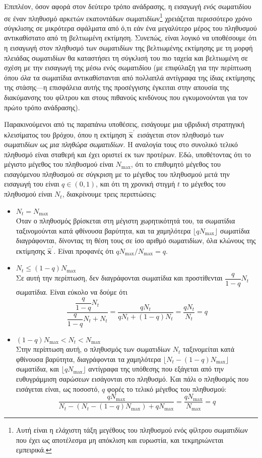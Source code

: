 Επιπλέον, όσον αφορά στον δεύτερο τρόπο ανάδρασης, η εισαγωγή \textit{ενός}
σωματιδίου σε έναν πληθυσμό αρκετών εκατοντάδων σωματιδίων\footnote{Αυτή είναι η
ελάχιστη τάξη μεγέθους του πληθυσμού ενός φίλτρου σωματιδίων που έχει ως
αποτέλεσμα μη απόκλιση και ευρωστία, και τεκμηριώνεται εμπειρικά.} χρειάζεται
περισσότερο χρόνο σύγκλισης σε μικρότερα σφάλματα από ό,τι εάν ένα μεγαλύτερο
μέρος του πληθυσμού αντικαθίστατο από τη βελτιωμένη εκτίμηση.  Συνεπώς, είναι
λογικό να υποθέσουμε ότι η εισαγωγή στον πληθυσμό των σωματιδίων της
βελτιωμένης εκτίμησης με τη μορφή πλειάδας σωματιδίων θα καταστήσει τη σύγκλισή
του πιο ταχεία και βελτιωμένη σε σχέση με την εισαγωγή της μέσω ενός σωματιδίου
(με επιφύλαξη για την περίπτωση όπου \textit{όλα} τα σωματίδια αντικαθίστανται
από πολλαπλά αντίγραφα της ίδιας εκτίμησης της στάσης---η επισφάλεια αυτής της
προσέγγισης έγκειται στην απουσία της διακύμανσης του φίλτρου και στους
πιθανούς κινδύνους που εγκυμονούνται για τον πρώτο τρόπο ανάδρασης).

Παρακινούμενοι από τις παραπάνω υποθέσεις, εισάγουμε μια υβριδική στρατηγική
κλεισίματος του βρόχου, όπου η εκτίμηση $\hat{\bm{x}}^{\prime}$ εισάγεται στον
πληθυσμό των σωματιδίων ως \textit{μια πληθώρα σωματιδίων}. Η αναλογία τους στο
συνολικό τελικό πληθυσμό είναι σταθερή και έχει οριστεί εκ των προτέρων. Εδώ,
υποθέτοντας ότι το μέγιστο μέγεθος του πληθυσμού είναι $N_{\max}$, ότι το
επιθυμητό μέγεθος του εισαγόμενου πληθυσμού σε σύγκριση με το μέγεθος του
πληθυσμού μετά την εισαγωγή του είναι $q \in (0,1)$, και ότι τη χρονική στιγμή
$t$ το μέγεθος του πληθυσμού είναι $N_t$, διακρίνουμε τρεις περιπτώσεις:

\begin{itemize}
  \item $N_t = N_{\max}$ \\
        Όταν ο πληθυσμός βρίσκεται στη μέγιστη χωρητικότητά του, τα σωματίδια
        ταξινομούνται κατά φθίνουσα βαρύτητα, και τα χαμηλότερα
        $\lfloor q N_{\max} \rfloor$ σωματίδια διαγράφονται, δίνοντας τη θέση
        τους σε ίσο αριθμό σωματιδίων, όλα κλώνους της εκτίμησης
        $\hat{\bm{x}}^{\prime}$. Είναι προφανές ότι $q N_{\max}/N_{\max} = q$.
  \item $N_t \leq (1-q) N_{\max}$ \\
        Σε αυτή την περίπτωση, δεν διαγράφονται σωματίδια και προστίθενται
        $\dfrac{q}{1-q}N_t$ σωματίδια. Είναι εύκολο να δούμε ότι
        $$\dfrac{\dfrac{q}{1-q}N_t}{\dfrac{q}{1-q}N_t + N_t} = \dfrac{qN_t}{qN_t + (1-q)N_t} = \dfrac{qN_t}{N_t} = q$$
  \item $(1-q) N_{\max} < N_t < N_{\max}$ \\
        Στην περίπτωση αυτή, ο πληθυσμός των σωματιδίων $N_t$ ταξινομείται κατά
        φθίνουσα βαρύτητα, διαγράφονται τα χαμηλότερα $\lfloor N_t - (1-q)N_{\max} \rfloor$
        σωματίδια, και $\lfloor q N_{\max} \rfloor$ αντίγραφα της υπόθεσης που
        εξάγεται από την ευθυγράμμιση σαρώσεων εισάγονται στο πληθυσμό. Και
        πάλι ο πληθυσμός που εισάγεται είναι, ως ποσοστό, $q$ φορές το τελικό
        μέγεθος του πληθυσμού:
        $$\dfrac{qN_{\max}}{N_t - (N_t - (1-q)N_{\max}) + qN_{\max}} = \dfrac{q N_{\max}}{N_{\max}} = q$$
\end{itemize}

